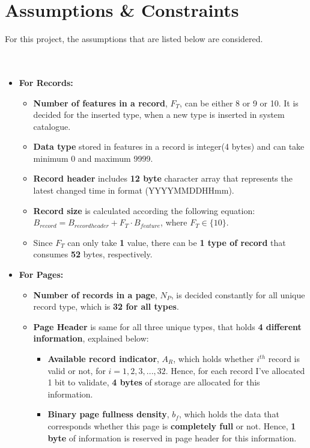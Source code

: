 \documentclass[12pt]{report}
\begin{document}
\chapter{Assumptions \& Constraints}
For this project, the assumptions that are listed below are considered. \\\\\\
\begin{itemize}
\item {\large \textbf{For Records:}}
\begin{itemize}
\item \textbf{Number of features in a record}, $F_{T}$, can be either 8 or 9 or 10. It is decided for the inserted type, when a new type is inserted in system catalogue.
\item \textbf{Data type} stored in features in a record is integer(4 bytes) and can take minimum 0 and maximum 9999.
\item \textbf{Record header} includes \textbf{12 byte} character array that represents the latest changed time in format (YYYYMMDDHHmm).
\item \textbf{Record size} is calculated according the following equation: \\ 
{\large $B_{record} = B_{recordheader} + {F_T}\cdot{B_{feature}}$, where ${F_T}\in{\{10\}}$}.
\item Since $F_{T}$ can only take \textbf{1} value, there can be \textbf{1 type of record} that consumes \textbf{52} bytes, respectively.
\end{itemize}
\newpage
\item {\large \textbf{For Pages:}}
\begin{itemize}
\item \textbf{Number of records in a page}, $N_P$, is decided constantly for all unique record type, which is \textbf{32 for all types}.
\item \textbf{Page Header} is same for all three unique types, that holds \textbf{4 different information}, explained below:
\begin{itemize}
\item \textbf{Available record indicator}, $A_R$, which holds whether $i^{th}$ record is valid or not, for ${i} = 1, 2, 3, ..., 32$. Hence, for each record I've allocated 1 bit to validate, \textbf{4 bytes} of storage are allocated for this information.
\item \textbf{Binary page fullness density}, $b_f$, which holds the data that corresponds whether this page is \textbf{completely full} or not. Hence, \textbf{1 byte} of information is reserved in page header for this information.

\end{itemize}
\end{itemize}
\end{itemize}
\end{document}
